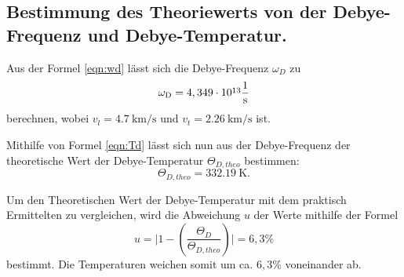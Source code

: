 \subsection{Bestimmung des Theoriewerts von der Debye-Frequenz und Debye-Temperatur.}

Aus der Formel \ref{eqn:wd} lässt sich die Debye-Frequenz $\omega_{\si{D}}$ zu
\begin{equation*}
    \omega_{\si{D}} = 4,349 \cdot \cramped{10^{13}} \frac{1}{\si{s}}
\end{equation*}
berechnen, wobei $v_{\si{l}}=\SI{4,7}{\kilo\metre\per\second}$ und 
$v_{\si{t}}=\SI{2,26}{\kilo\metre\per\second}$ ist.

Mithilfe von Formel \ref{eqn:Td} lässt sich nun aus der Debye-Frequenz der theoretische Wert der 
Debye-Temperatur $\Theta_{\si{D,theo}}$ bestimmen:
\begin{equation*}
    \Theta_{\si{D,theo}} = \SI{332,19}{\kelvin}.
\end{equation*}
 
Um den Theoretischen Wert der Debye-Temperatur mit dem praktisch Ermittelten zu vergleichen, wird die 
Abweichung $u$ der Werte mithilfe der Formel
\begin{equation*}
    u = \biggl| 1-\left(\frac{\Theta_{\si{D}}}{\Theta_{\si{D,theo}}}\right) \biggr| = 6,3\%
\end{equation*}
bestimmt. Die Temperaturen weichen somit um ca. $6,3$\% voneinander ab.
 
 
 
 
  
 


 



 
 
 
 
 
 

 
 




